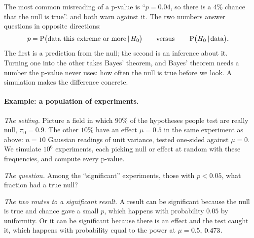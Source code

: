 The most common misreading of a p-value is ``$p=0.04$, so there is a $4\%$
chance that the null is true''.  and  both
warn against it. The two numbers answer questions in opposite directions:
\[
  p=\operatorname{P}\bigl(\text{data this extreme or more}\,\vert\,H_0\bigr)
  \qquad\text{versus}\qquad
  \operatorname{P}\bigl(H_0\,\vert\,\text{data}\bigr).
\]
The first is a prediction from the null; the second is an inference about it.
Turning one into the other takes Bayes' theorem, and Bayes' theorem needs a
number the p-value never uses: how often the null is true before we look.
A simulation makes the difference concrete.

\paragraph{Example: a population of experiments.}
\emph{The setting.} Picture a field in which $90\%$ of the hypotheses people
test are really null, $\pi_0=0.9$. The other $10\%$ have an effect $\mu=0.5$
in the same experiment as above: $n=10$ Gaussian readings of unit variance,
tested one-sided against $\mu=0$. We simulate $10^6$ experiments, each picking
null or effect at random with these frequencies, and compute every p-value.

\emph{The question.} Among the ``significant'' experiments, those with
$p<0.05$, what fraction had a true null?

\emph{The two routes to a significant result.} A result can be significant
because the null is true and chance gave a small $p$, which happens with
probability $0.05$ by uniformity. Or it can be significant because there is an
effect and the test caught it, which happens with probability equal to the
power at $\mu=0.5$, $0.473$.

